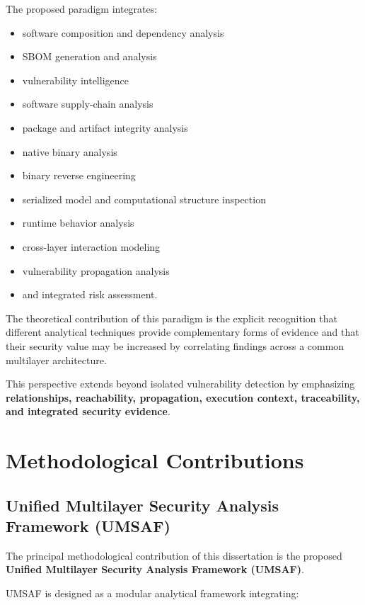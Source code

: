 \documentclass[
  12pt,
  letterpaper,
  oneside]{report}
\providecommand{\tightlist}{%
  \setlength{\itemsep}{0pt}\setlength{\parskip}{0pt}}
\begin{document}
The proposed paradigm integrates:

\begin{itemize}
\tightlist
\item
  software composition and dependency analysis
\item
  SBOM generation and analysis
\item
  vulnerability intelligence
\item
  software supply-chain analysis
\item
  package and artifact integrity analysis
\item
  native binary analysis
\item
  binary reverse engineering
\item
  serialized model and computational structure inspection
\item
  runtime behavior analysis
\item
  cross-layer interaction modeling
\item
  vulnerability propagation analysis
\item
  and integrated risk assessment.
\end{itemize}

The theoretical contribution of this paradigm is the explicit
recognition that different analytical techniques provide complementary
forms of evidence and that their security value may be increased by
correlating findings across a common multilayer architecture.

This perspective extends beyond isolated vulnerability detection by
emphasizing \textbf{relationships, reachability, propagation, execution
context, traceability, and integrated security evidence}.

\section{Methodological Contributions}\label{122-methodological-contributions}

\subsection{Unified Multilayer Security Analysis Framework (UMSAF)}\label{1221-unified-multilayer-security-analysis-framework-umsaf}

The principal methodological contribution of this dissertation is the
proposed \textbf{Unified Multilayer Security Analysis Framework
(UMSAF)}.

UMSAF is designed as a modular analytical framework integrating:
\end{document}
